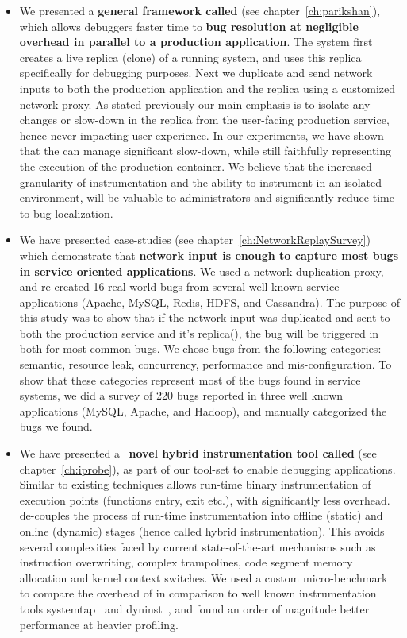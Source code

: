\begin{itemize}
	\item We presented a \textbf{general framework called  \parikshan} (see chapter~\ref{ch:parikshan}), which allows debuggers faster time to \textbf{bug resolution at negligible overhead in parallel to a production application}. 
	The system first creates a live replica (clone) of a running system, and uses this replica specifically for debugging purposes.
	Next we duplicate and send network inputs to both the production application and the replica using a customized network proxy.
	As stated previously our main emphasis is to isolate any changes or slow-down in the replica from the user-facing production service, hence never impacting user-experience.
	In our experiments, we have shown that the \debugcontainer can manage significant slow-down, while still faithfully representing the execution of the production container.
	We believe that the increased granularity of instrumentation and the ability to instrument in an isolated environment, will be valuable to administrators and significantly reduce time to bug localization.
	
	\item We have presented case-studies (see chapter~\ref{ch:NetworkReplaySurvey}) which demonstrate that \textbf{network input is enough to capture most bugs in service oriented applications}. We used a network duplication proxy, and re-created 16 real-world bugs from several well known service applications (Apache, MySQL, Redis, HDFS, and Cassandra). The purpose of this study was to show that if the network input was duplicated and sent to both the production service and it's replica(\debugcontainer), the bug will be triggered in both for most common bugs.
	We chose bugs from the following categories: semantic, resource leak, concurrency, performance and mis-configuration. 
	To show that these categories represent most of the bugs found in service systems, we did a survey of 220 bugs reported in three well known applications (MySQL, Apache, and Hadoop), and manually categorized the bugs we found. 
	
	\item We have presented a ~\textbf{novel hybrid instrumentation tool called \iprobe} (see chapter~\ref{ch:iprobe}), as part of our tool-set to enable debugging applications. 
	Similar to existing techniques \iprobe allows run-time binary instrumentation of execution points (functions entry, exit etc.), with significantly less overhead.
	\iprobe de-couples the process of run-time instrumentation into offline (static) and online (dynamic) stages (hence called hybrid instrumentation). 
	This avoids several complexities faced by current state-of-the-art mechanisms such as instruction overwriting, complex trampolines, code segment memory allocation and kernel context switches.
	We used a custom micro-benchmark to compare the overhead of \iprobe in comparison to well known instrumentation tools systemtap~\cite{systemtap} and dyninst~\cite{dyninst}, and found an order of magnitude better performance at heavier profiling.
	

\end{itemize}
